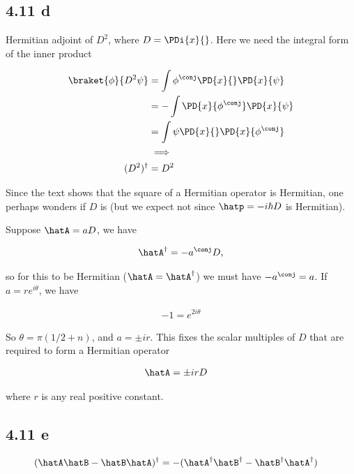 \subsection{ 4.11 d}

Hermitian adjoint of $D^2$, where $D = \PDi{x}{}$.  Here we need the integral form of the inner product

\begin{align*}
\braket{\phi}{D^2 \psi} 
&=
\int \phi^\conj \PD{x}{}\PD{x}{\psi} \\
&=
-\int \PD{x}{\phi^\conj} \PD{x}{\psi} \\
&=
\int \psi \PD{x}{}\PD{x}{\phi^\conj} \\
&\implies \\
(D^2)^\dagger &= D^2
\end{align*}

Since the text shows that the square of a Hermitian operator is Hermitian, one perhaps wonders if $D$ is (but we expect not since $\hatp = -i \hbar D$ is Hermitian).

Suppose $\hatA = aD$, we have 

\begin{align*}
\hatA^\dagger = -a^\conj D,
\end{align*}

so for this to be Hermitian ($\hatA = \hatA^\dagger$) we must have $- a^\conj = a$.  If $a = r e^{i\theta}$, we have

\begin{align*}
-1 = e^{2 i\theta}
\end{align*}

So $\theta = \pi (1/2 + n)$, and $a = \pm i r$.  This fixes the scalar multiples of $D$ that are required to form a Hermitian operator

\begin{align*}
\hatA &= \pm i r D
\end{align*}

where $r$ is any real positive constant.

\subsection{ 4.11 e}

\begin{align*}
(\hatA \hatB - \hatB \hatA)^\dagger &= - (\hatA^\dagger \hatB^\dagger - \hatB^\dagger \hatA^\dagger)
\end{align*}

